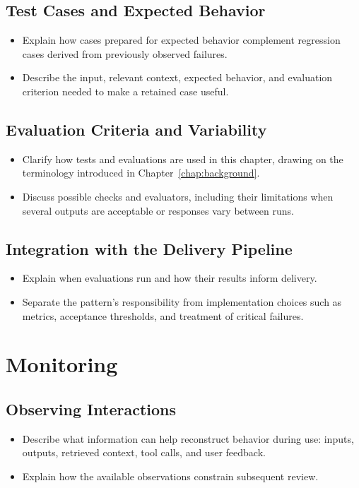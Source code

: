 \subsection{Test Cases and Expected Behavior}
\begin{itemize}
  \item Explain how cases prepared for expected behavior complement regression
    cases derived from previously observed failures.
  \item Describe the input, relevant context, expected behavior, and evaluation
    criterion needed to make a retained case useful.
\end{itemize}

\subsection{Evaluation Criteria and Variability}
\begin{itemize}
  \item Clarify how tests and evaluations are used in this chapter, drawing on
    the terminology introduced in Chapter~\ref{chap:background}.
  \item Discuss possible checks and evaluators, including their limitations when
    several outputs are acceptable or responses vary between runs.
\end{itemize}

\subsection{Integration with the Delivery Pipeline}
\begin{itemize}
  \item Explain when evaluations run and how their results inform delivery.
  \item Separate the pattern's responsibility from implementation choices such
    as metrics, acceptance thresholds, and treatment of critical failures.
\end{itemize}

\section{Monitoring}
\label{sec:cd4ai-monitoring}

\subsection{Observing Interactions}
\begin{itemize}
  \item Describe what information can help reconstruct behavior during use:
    inputs, outputs, retrieved context, tool calls, and user feedback.
  \item Explain how the available observations constrain subsequent review.
\end{itemize}


